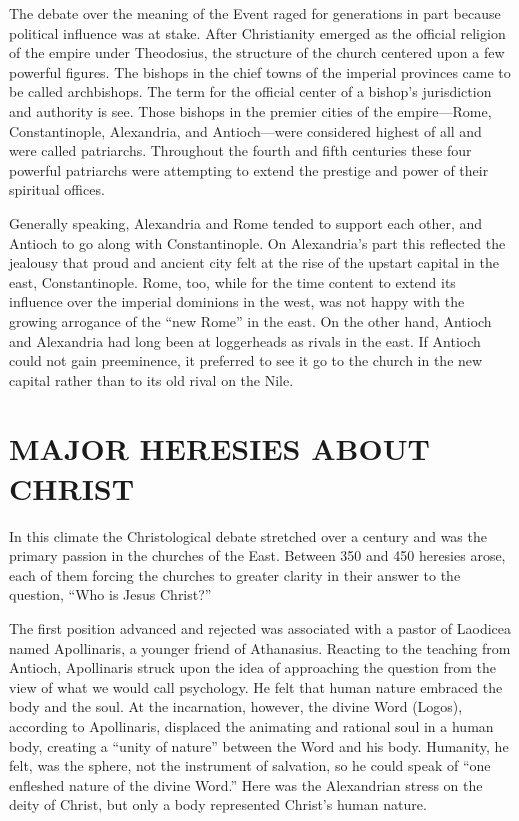 The debate over the meaning of the Event raged for generations in part because political influence
was at stake. After Christianity emerged as the official religion of the empire under Theodosius,
the structure of the church centered upon a few powerful figures. The bishops in the chief towns of
the imperial provinces came to be called archbishops. The term for the official center of a bishop’s
jurisdiction and authority is see. Those bishops in the premier cities of the empire—Rome,
Constantinople, Alexandria, and Antioch—were considered highest of all and were called patriarchs.
Throughout the fourth and fifth centuries these four powerful patriarchs were attempting to extend
the prestige and power of their spiritual offices.

Generally speaking, Alexandria and Rome tended to support each other, and Antioch to go along with
Constantinople. On Alexandria’s part this reflected the jealousy that proud and ancient city felt at
the rise of the upstart capital in the east, Constantinople. Rome, too, while for the time content
to extend its influence over the imperial dominions in the west, was not happy with the growing
arrogance of the “new Rome” in the east. On the other hand, Antioch and Alexandria had long been at
loggerheads as rivals in the east. If Antioch could not gain preeminence, it preferred to see it go
to the church in the new capital rather than to its old rival on the Nile.

\section{MAJOR HERESIES ABOUT CHRIST}

In this climate the Christological debate stretched over a century and was the primary passion in
the churches of the East. Between 350 and 450 heresies arose, each of them forcing the churches to
greater clarity in their answer to the question, “Who is Jesus Christ?”

The first position advanced and rejected was associated with a pastor of Laodicea named Apollinaris,
a younger friend of Athanasius. Reacting to the teaching from Antioch, Apollinaris struck upon the
idea of approaching the question from the view of what we would call psychology. He felt that human
nature embraced the body and the soul. At the incarnation, however, the divine Word (Logos),
according to Apollinaris, displaced the animating and rational soul in a human body, creating a
“unity of nature” between the Word and his body. Humanity, he felt, was the sphere, not the
instrument of salvation, so he could speak of “one enfleshed nature of the divine Word.” Here was
the Alexandrian stress on the deity of Christ, but only a body represented Christ’s human nature.

